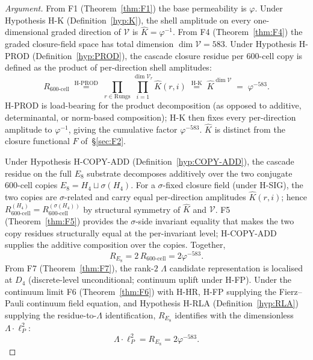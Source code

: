 \documentclass[12pt]{article}
\theoremstyle{definition}
\theoremstyle{remark}
\newcommand{\Vcal}{\mathcal{V}}
\begin{document}
\begin{proof}[Argument]
From F1 (Theorem~\ref{thm:F1}) the base permeability is $\varphi$. Under Hypothesis H-K (Definition~\ref{hyp:K}), the shell amplitude on every one-dimensional graded direction of $\Vcal$ is $\widehat{K} = \varphi^{-1}$. From F4 (Theorem~\ref{thm:F4}) the graded closure-field space has total dimension $\dim \Vcal = 583$. Under Hypothesis H-PROD (Definition~\ref{hyp:PROD}), the cascade closure residue per 600-cell copy is defined as the product of per-direction shell amplitudes:
\begin{equation}\label{eq:lambda-single-cell}
R_{600\text{-cell}} \;\stackrel{\text{H-PROD}}{=}\; \prod_{r \in \mathrm{Rungs}} \prod_{i=1}^{\dim \Vcal_r} \widehat{K}(r, i) \;\stackrel{\text{H-K}}{=}\; \widehat{K}^{\dim \Vcal} \;=\; \varphi^{-583}.
\end{equation}
H-PROD is load-bearing for the product decomposition (as opposed to additive, determinantal, or norm-based composition); H-K then fixes every per-direction amplitude to $\varphi^{-1}$, giving the cumulative factor $\varphi^{-583}$. $\widehat{K}$ is distinct from the closure functional $F$ of~\S\ref{sec:F2}.

Under Hypothesis H-COPY-ADD (Definition~\ref{hyp:COPY-ADD}), the cascade residue on the full $E_8$ substrate decomposes additively over the two conjugate 600-cell copies $E_8 = H_4 \sqcup \sigma(H_4)$. For a $\sigma$-fixed closure field (under H-SIG), the two copies are $\sigma$-related and carry equal per-direction amplitudes $\widehat{K}(r, i)$; hence $R_{600\text{-cell}}^{(H_4)} = R_{600\text{-cell}}^{(\sigma(H_4))}$ by structural symmetry of $\widehat{K}$ and $\Vcal$. F5 (Theorem~\ref{thm:F5}) provides the $\sigma$-side invariant equality that makes the two copy residues structurally equal at the per-invariant level; H-COPY-ADD supplies the additive composition over the copies. Together,
\begin{equation}
R_{E_8} = 2 \,R_{600\text{-cell}} = 2 \varphi^{-583}.
\end{equation}
From F7 (Theorem~\ref{thm:F7}), the rank-$2$ $\Lambda$ candidate representation is localised at $D_4$ (discrete-level unconditional; continuum uplift under H-FP). Under the continuum limit F6 (Theorem~\ref{thm:F6}) with H-HR, H-FP supplying the Fierz--Pauli continuum field equation, and Hypothesis H-RLA (Definition~\ref{hyp:RLA}) supplying the residue-to-$\Lambda$ identification, $R_{E_8}$ identifies with the dimensionless $\Lambda \cdot \ell_P^2$:
\begin{equation}
\Lambda \cdot \ell_P^2 = R_{E_8} = 2 \varphi^{-583}.
\end{equation}
\end{proof}
\end{document}
